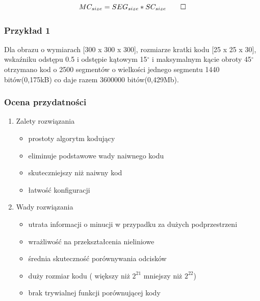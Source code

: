 \begin{equation}
MC_{size}=SEG_{size}*SC_{size} \qedhere \\
\label{eq:MC_size}
\end{equation}

\subsubsection{Przykład 1}
Dla obrazu o wymiarach [300 x 300 x 300], rozmiarze kratki kodu [25 x 25 x 30], wskaźniku odstępu 0.5 i odstępie kątowym 15$^\circ$ i maksymalnym kącie obroty 45$^\circ$ otrzymano kod o 
2500 segmentów o wielkości jednego segmentu 1440 bitów(0,175kB) co daje razem 3600000 bitów(0,429Mb). 

\subsubsection{Ocena przydatności}

\begin{enumerate}
\item Zalety rozwiązania
\renewcommand*{\labelitemi}{\bullet}
\begin{itemize}
\item prostoty algorytm kodujący
\item eliminuje podstawowe wady naiwnego kodu
\item skuteczniejszy niż naiwny kod
\item łatwość konfiguracji
\end{itemize}
\item Wady rozwiązania
\renewcommand*{\labelitemi}{\bullet}
\begin{itemize}
\item utrata informacji o minucji w przypadku za dużych podprzestrzeni
\item wrażliwość na przekształcenia nieliniowe
\item średnia skuteczność porównywania odcisków
\item duży rozmiar kodu ( większy niż $2^{21}$ mniejszy niż $2^{22}$)
\item brak trywialnej funkcji porównującej kody
\end{itemize}
\end{enumerate}
\vspace{.5cm}\par

